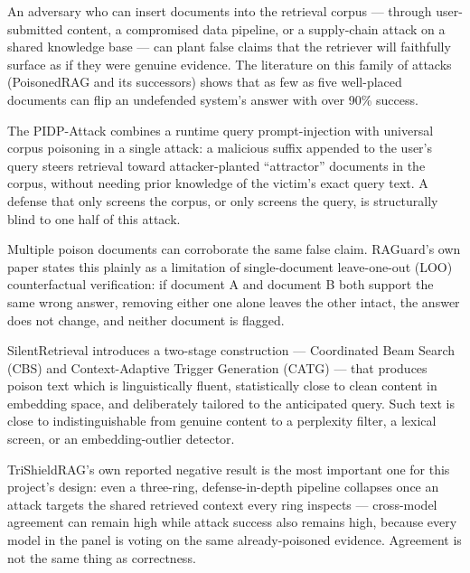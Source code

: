 \begin{description}[leftmargin=0pt,style=nextline,font=\bfseries\color{navy}]
\item[Corpus poisoning attacks.] An adversary who can insert documents
  into the retrieval corpus --- through user-submitted content, a
  compromised data pipeline, or a supply-chain attack on a shared
  knowledge base --- can plant false claims that the retriever will
  faithfully surface as if they were genuine evidence. The literature on
  this family of attacks (PoisonedRAG and its successors) shows that as
  few as five well-placed documents can flip an undefended system's
  answer with over 90\% success.

\item[Compound query-and-corpus attacks (PIDP).] The PIDP-Attack combines
  a runtime query prompt-injection with universal corpus poisoning in a
  single attack: a malicious suffix appended to the user's query steers
  retrieval toward attacker-planted ``attractor'' documents in the
  corpus, without needing prior knowledge of the victim's exact query
  text. A defense that only screens the corpus, or only screens the
  query, is structurally blind to one half of this attack.

\item[Collusion and coordinated multi-document poisoning.] Multiple
  poison documents can corroborate the same false claim. RAGuard's own
  paper states this plainly as a limitation of single-document
  leave-one-out (LOO) counterfactual verification: if document A and
  document B both support the same wrong answer, removing either one
  alone leaves the other intact, the answer does not change, and neither
  document is flagged.

\item[Semantically fluent, stealth poisoning (SilentRetrieval).]
  SilentRetrieval introduces a two-stage construction --- Coordinated
  Beam Search (CBS) and Context-Adaptive Trigger Generation (CATG) ---
  that produces poison text which is linguistically fluent, statistically
  close to clean content in embedding space, and deliberately tailored to
  the anticipated query. Such text is close to indistinguishable from
  genuine content to a perplexity filter, a lexical screen, or an
  embedding-outlier detector.

\item[False consensus in layered defenses (TriShieldRAG).] TriShieldRAG's
  own reported negative result is the most important one for this
  project's design: even a three-ring, defense-in-depth pipeline
  collapses once an attack targets the shared retrieved context every
  ring inspects --- cross-model agreement can remain high while attack
  success also remains high, because every model in the panel is voting
  on the same already-poisoned evidence. Agreement is not the same thing
  as correctness.
\end{description}

